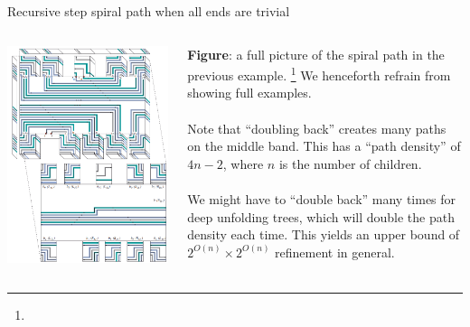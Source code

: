 \documentclass[handout]{beamer}
\theoremstyle{plain}
\begin{document}
  \begin{frame}{Recursive step spiral path when all ends are trivial}
    \begin{columns}
      \begin{column}{.5\textwidth}
        \includegraphics[height=.8\textheight]{./figs/Recursive_step_example_capped.png}
      \end{column}
      \begin{column}{.5\textwidth}
        \footnotesize \textbf{Figure}: a full picture of the spiral path in the previous example.
        \footnote[frame]{}
        We henceforth refrain from showing full examples.\\
        \;\\
        \pause Note that ``doubling back'' creates many paths on the middle band.
        This has a ``path density'' of $4n - 2$, where $n$ is the number of children.\\
        \;\\
        \pause We might have to ``double back'' many times for deep unfolding trees, which will double the path density each time.
        This yields an upper bound of $2^{O(n)} \times 2^{O(n)}$ refinement in general.
      \end{column}
    \end{columns}
  \end{frame}
\end{document}
